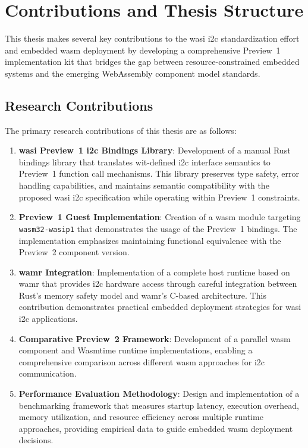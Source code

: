 \section*{Contributions and Thesis Structure}
\label{sec:contributions-structure}

This thesis makes several key contributions to the \acrshort{wasi} \acrshort{i2c} standardization effort and embedded \acrshort{wasm} deployment by developing a comprehensive Preview~1 implementation kit that bridges the gap between resource-constrained embedded systems and the emerging WebAssembly component model standards.

\subsection*{Research Contributions}
\label{subsec:research-contributions}

The primary research contributions of this thesis are as follows:

\begin{enumerate}
    \item \textbf{\acrshort{wasi} Preview~1 \acrshort{i2c} Bindings Library}: Development of a manual Rust bindings library that translates \acrshort{wit}-defined \acrshort{i2c} interface semantics to Preview~1 function call mechanisms. This library preserves type safety, error handling capabilities, and maintains semantic compatibility with the proposed \acrshort{wasi} \acrshort{i2c} specification while operating within Preview~1 constraints.

    \item \textbf{Preview~1 Guest Implementation}: Creation of a \acrshort{wasm} module targeting \sloppy\texttt{wasm32-wasip1} that demonstrates the usage of the Preview~1 bindings. The implementation emphasizes maintaining functional equivalence with the Preview~2 component version.

    \item \textbf{\acrshort{wamr} Integration}: Implementation of a complete host runtime based on \acrshort{wamr} that provides \acrshort{i2c} hardware access through careful integration between Rust's memory safety model and \acrshort{wamr}'s C-based architecture. This contribution demonstrates practical embedded deployment strategies for \acrshort{wasi} \acrshort{i2c} applications.

    \item \textbf{Comparative Preview~2 Framework}: Development of a parallel \acrshort{wasm} component and Wasmtime runtime implementations, enabling a comprehensive comparison across different \acrshort{wasm} approaches for \acrshort{i2c} communication.

    \item \textbf{Performance Evaluation Methodology}: Design and implementation of a benchmarking framework that measures startup latency, execution overhead, memory utilization, and resource efficiency across multiple runtime approaches, providing empirical data to guide embedded \acrshort{wasm} deployment decisions.
\end{enumerate}

